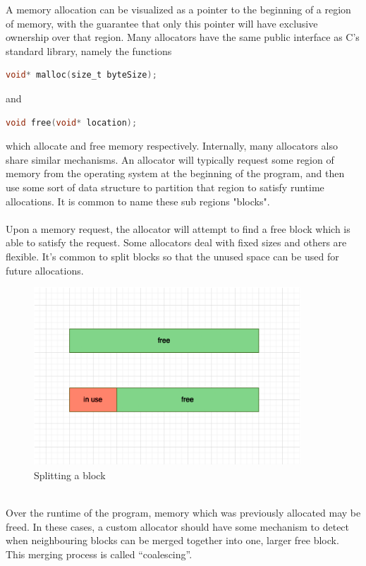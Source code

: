 \documentclass{article}
\begin{document}
A memory allocation can be visualized as a pointer to the beginning of a region of memory, with the guarantee that only this pointer will have exclusive ownership over that region. Many allocators have the same public interface as C's standard library, namely the functions \\
\begin{lstlisting}[language=C]
void* malloc(size_t byteSize);
\end{lstlisting}
and 
\begin{lstlisting}[language=C]
void free(void* location);
\end{lstlisting}
which allocate and free memory respectively. Internally, many allocators also share similar mechanisms. An allocator will typically request some region of memory from the operating system at the beginning of the program, and then use some sort of data structure to partition that region to satisfy runtime allocations. It is common to name these sub regions "blocks".\\
\\
Upon a memory request, the allocator will attempt to find a free block which is able to satisfy the request. Some allocators deal with fixed sizes and others are flexible. It's common to split blocks so that the unused space can be used for future allocations.
\\
\begin{figure}[h]
	\centering
	\includegraphics[width=10cm]{split}
	\captionsetup{width=10cm}
	\caption{Splitting a block}
\end{figure}
\\
Over the runtime of the program, memory which was previously allocated may be freed. In these cases, a custom allocator should have some mechanism to detect when neighbouring blocks can be merged together into one, larger free block. This merging process is called ``coalescing''.\\
\end{document}
